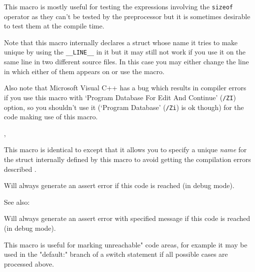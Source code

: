 This macro is mostly useful for testing the expressions involving the
{\tt sizeof} operator as they can't be tested by the preprocessor but it is
sometimes desirable to test them at the compile time.

Note that this macro internally declares a struct whose name it tries to make
unique by using the {\tt \_\_LINE\_\_} in it but it may still not work if you
use it on the same line in two different source files. In this case you may
either change the line in which either of them appears on or use the
 macro.

Also note that Microsoft Visual C++ has a bug which results in compiler errors
if you use this macro with `Program Database For Edit And Continue'
(\texttt{/ZI}) option, so you shouldn't use it (`Program Database'
(\texttt{/Zi}) is ok though) for the code making use of this macro.


,\\


\label{wxcompiletimeassert2}


This macro is identical to 
except that it allows you to specify a unique {\it name} for the struct
internally defined by this macro to avoid getting the compilation errors
described .


\label{wxfail}


Will always generate an assert error if this code is reached (in debug mode).

See also: 


\label{wxfailmsg}


Will always generate an assert error with specified message if this code is reached (in debug mode).

This macro is useful for marking unreachable" code areas, for example
it may be used in the "default:" branch of a switch statement if all possible
cases are processed above.

